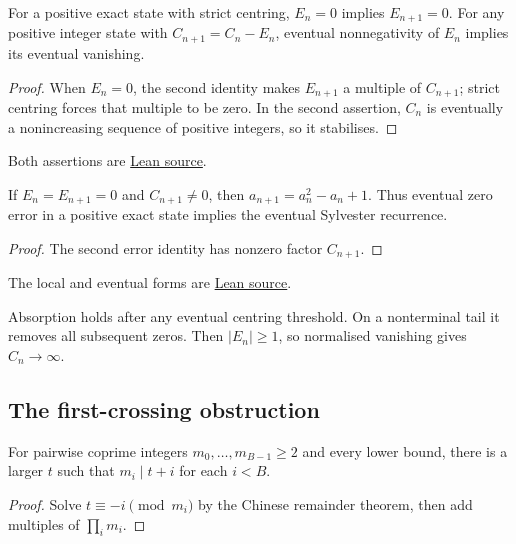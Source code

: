 \documentclass[11pt]{article}
\begin{document}
\begin{theorem}\label{res:absorb}\label{res:descent}
For a positive exact state with strict centring, $E_n=0$ implies
$E_{n+1}=0$. For any positive integer state with $C_{n+1}=C_n-E_n$,
eventual nonnegativity of $E_n$ implies its eventual vanishing.
\end{theorem}
\begin{proof}
When $E_n=0$, the second identity makes $E_{n+1}$ a multiple of
$C_{n+1}$; strict centring forces that multiple to be zero. In the second
assertion, $C_n$ is eventually a nonincreasing sequence of positive
integers, so it stabilises.
\end{proof}

\noindent Both assertions are
\href{https://github.com/wcook04/plectis-erdos/blob/f36a98bf3d3e6f65f1074e3b800e3293d5b8a51a/ErdosProblems/Erdos243/PaperCompleteR7/Arithmetic.lean#L120}{Lean source}.

\begin{corollary}\label{res:step}\label{res:eventual}
If $E_n=E_{n+1}=0$ and $C_{n+1}\ne0$, then
$a_{n+1}=a_n^2-a_n+1$. Thus eventual zero error in a positive exact state
implies the eventual Sylvester recurrence.
\end{corollary}
\begin{proof}
The second error identity has nonzero factor $C_{n+1}$.
\end{proof}

\noindent The local and eventual forms are
\href{https://github.com/wcook04/plectis-erdos/blob/f36a98bf3d3e6f65f1074e3b800e3293d5b8a51a/ErdosProblems/Erdos243/PaperCompleteR7/Arithmetic.lean#L138}{Lean source}.

Absorption holds after any eventual centring threshold. On a nonterminal
tail it removes all subsequent zeros. Then $|E_n|\ge1$, so normalised
vanishing gives $C_n\to\infty$.

\subsection{The first-crossing obstruction}\label{sec:barrier}
\begin{lemma}\label{res:crt}
For pairwise coprime integers $m_0,\ldots,m_{B-1}\ge2$ and every lower
bound, there is a larger $t$ such that $m_i\mid t+i$ for each $i<B$.
\end{lemma}
\begin{proof}
Solve $t\equiv-i\pmod{m_i}$ by the Chinese remainder theorem, then add
multiples of $\prod_i m_i$.
\end{proof}
\end{document}
